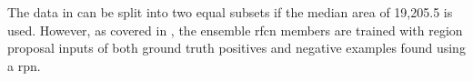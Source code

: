 The data in  can be split into two equal subsets if the median area of 19,205.5 is used. However, as covered in , the ensemble \gls{rfcn} members are trained with region proposal inputs of both ground truth positives and negative examples found using a \gls{rpn}.

